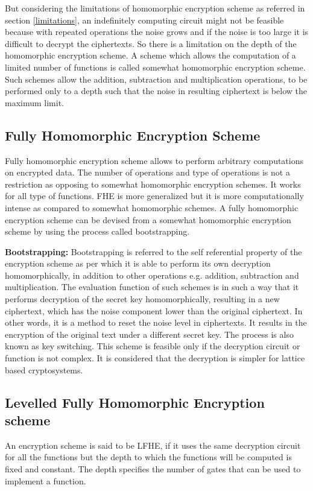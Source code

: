      \noindent But considering the limitations of homomorphic encryption scheme as referred in section \ref{limitations}, an indefinitely computing circuit might not be feasible because with repeated operations the noise grows and if the noise is too large it is difficult to decrypt the ciphertexts. So there is a limitation on the depth of the homomorphic encryption scheme. A scheme which allows the computation of a limited number of functions is called somewhat homomorphic encryption scheme. Such schemes allow the addition, subtraction and multiplication operations, to be performed only to a depth such that the noise in resulting ciphertext is below the maximum limit. 
 \subsection{Fully Homomorphic Encryption Scheme}  
 Fully homomorphic encryption scheme allows to perform arbitrary computations on encrypted data. The number of operations and type of operations is not a restriction as opposing to somewhat homomorphic encryption schemes. It works for all type of functions. FHE is more generalized but it is more computationally intense as compared to somewhat homomorphic schemes. A fully homomorphic encryption scheme can be devised from a somewhat homomorphic encryption scheme by using the process called bootstrapping.

 \vspace{0.25cm}
  \noindent \textbf{Bootstrapping:} Bootstrapping is referred to the self referential property of the encryption scheme as per which it is able to perform its own decryption homomorphically, in addition to other operations e.g. addition, subtraction and multiplication. The evaluation function of such schemes is in such a way that it performs decryption of the secret key homomorphically, resulting in a new ciphertext, which has the noise component lower than the original ciphertext. In other words, it is a method to reset the noise level in ciphertexts. It results in the encryption of the original text under a different secret key. The process is also known as key switching. This scheme is feasible only if the decryption circuit or function is not complex. It is considered that the decryption is simpler for lattice based cryptosystems. 
  
\subsection{Levelled Fully Homomorphic Encryption scheme}
An encryption scheme is said to be LFHE, if it uses the same decryption circuit for all the functions but the depth to which the functions will be computed is fixed and constant. The depth specifies the number of gates that can be used to implement a function. 

